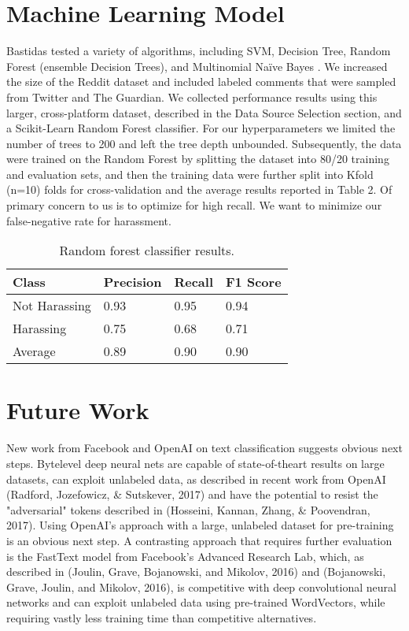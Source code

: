 \documentclass[11pt,a4paper]{article}
\begin{document}
\section{Machine Learning Model}
Bastidas tested a variety of algorithms, including
SVM, Decision Tree, Random Forest (ensemble
Decision Trees), and Multinomial Naïve Bayes
\cite{Bastidas:2016}. We increased the size of the
Reddit dataset and included labeled comments that
were sampled from Twitter and The Guardian. We
collected performance results using this larger,
cross-platform dataset, described in the Data
Source Selection section, and a Scikit-Learn Random
Forest classifier. For our hyperparameters we
limited the number of trees to 200 and left the tree
depth unbounded. Subsequently, the data were
trained on the Random Forest by splitting the dataset
into 80/20 training and evaluation sets, and
then the training data were further split into Kfold
(n=10) folds for cross-validation and the average
results reported in Table 2. Of primary concern to
us is to optimize for high recall. We want to minimize
our false-negative rate for harassment.

\begin{table}[h]
\begin{center}
\begin{tabular}{|l|l|l|l|}
\hline \bf Class & \bf Precision & \bf Recall & \bf F1 Score \\ \hline
Not Harassing & 0.93 & 0.95 & 0.94 \\
Harassing & 0.75 & 0.68 & 0.71 \\
Average & 0.89 & 0.90 & 0.90 \\
\hline
\end{tabular}
\end{center}
\caption{\label{font-table} Random forest classifier results. }
\end{table}

\section{Future Work}
New work from Facebook and OpenAI on text
classification suggests obvious next steps. Bytelevel
deep neural nets are capable of state-of-theart
results on large datasets, can exploit unlabeled
data, as described in recent work from OpenAI
(Radford, Jozefowicz, \& Sutskever, 2017) and
have the potential to resist the "adversarial" tokens
described in (Hosseini, Kannan, Zhang, \& Poovendran,
2017). Using OpenAI's approach with a large,
unlabeled dataset for pre-training is an obvious
next step. A contrasting approach that requires further
evaluation is the FastText model from Facebook's
Advanced Research Lab, which, as described
in (Joulin, Grave, Bojanowski, and
Mikolov, 2016) and (Bojanowski, Grave, Joulin,
and Mikolov, 2016), is competitive with deep convolutional
neural networks and can exploit unlabeled
data using pre-trained WordVectors, while requiring
vastly less training time than competitive
alternatives.
\end{document}
